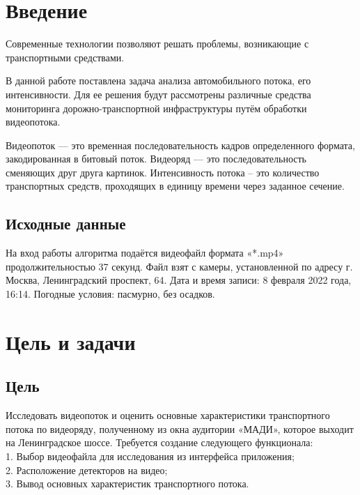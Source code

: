 \documentclass[a4paper,12pt]{article}
\begin{document}
\newpage
\tableofcontents


\newpage
\section{Введение}  
Современные технологии позволяют решать проблемы, возникающие с транспортными средствами.

В данной работе поставлена задача анализа автомобильного потока, его интенсивности.
Для ее решения будут рассмотрены различные средства мониторинга дорожно-транспортной инфраструктуры путём обработки видеопотока.

Видеопоток — это временная последовательность кадров определенного формата, закодированная в битовый поток.
Видеоряд — это последовательность сменяющих друг друга картинок. 
Интенсивность потока – это количество транспортных средств, проходящих в единицу времени через заданное сечение. 

\subsection{Исходные данные}
На вход работы алгоритма подаётся видеофайл формата «*.mp4»  продолжительностью 37 секунд. Файл взят с камеры, установленной по адресу г. Москва, Ленинградский проспект, 64. Дата и время записи: 8 февраля 2022 года, 16:14. Погодные условия: пасмурно, без осадков. 

\newpage

\section{Цель и задачи}  
\subsection{Цель}  
Исследовать видеопоток и оценить основные характеристики транспортного потока по видеоряду, полученному из окна аудитории «МАДИ», которое выходит на Ленинградское шоссе. Требуется создание следующего функционала:\\
1.	Выбор видеофайла для исследования из интерфейса приложения;\\
2.	Расположение детекторов на видео;\\
3.	Вывод основных характеристик транспортного потока.\\
\end{document}
